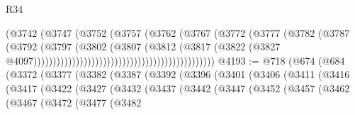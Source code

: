 \begin{lexlean}{R34}
\begin{coremodule}
                                                              (@3742
                                                                (@3747
                                                                  (@3752
                                                                    (@3757
                                                                      (@3762
                                                                        (@3767
                                                                          (@3772
                                                                            (@3777
                                                                              (@3782
                                                                                (@3787
                                                                                  (@3792
                                                                                    (@3797
                                                                                      (@3802
                                                                                        (@3807
                                                                                          (@3812
                                                                                            (@3817
                                                                                              (@3822
                                                                                                (@3827
                                                                                                  @4097)))))))))))))))))))))))))))))))))))))))))))))))
@4193 := @718
    (@674
      (@684
        (@3372
          (@3377
            (@3382
              (@3387
                (@3392
                  (@3396
                    (@3401
                      (@3406
                        (@3411
                          (@3416
                            (@3417
                              (@3422
                                (@3427
                                  (@3432
                                    (@3437
                                      (@3442
                                        (@3447
                                          (@3452
                                            (@3457
                                              (@3462
                                                (@3467
                                                  (@3472
                                                    (@3477
                                                      (@3482

\end{coremodule}
\end{lexlean}
